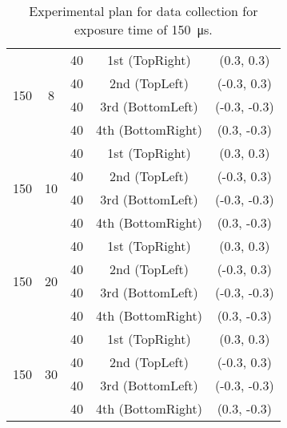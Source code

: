 \begin{table}[ht]
{\begin{tabular}{ccccc}
                \midrule

                \multirow{4}{*}{150} & \multirow{4}{*}{8} & 40 & 1st (\textsf{TopRight}) & (0.3, 0.3) \\
                & & 40 & 2nd (\textsf{TopLeft}) & (-0.3, 0.3) \\
                & & 40 & 3rd (\textsf{BottomLeft}) & (-0.3, -0.3) \\
                & & 40 & 4th (\textsf{BottomRight}) & (0.3, -0.3) \\

                \midrule

                \multirow{4}{*}{150} & \multirow{4}{*}{10} & 40 & 1st (\textsf{TopRight}) & (0.3, 0.3) \\
                & & 40 & 2nd (\textsf{TopLeft}) & (-0.3, 0.3) \\
                & & 40 & 3rd (\textsf{BottomLeft}) & (-0.3, -0.3) \\
                & & 40 & 4th (\textsf{BottomRight}) & (0.3, -0.3) \\

                \midrule

                \multirow{4}{*}{150} & \multirow{4}{*}{20} & 40 & 1st (\textsf{TopRight}) & (0.3, 0.3) \\
                & & 40 & 2nd (\textsf{TopLeft}) & (-0.3, 0.3) \\
                & & 40 & 3rd (\textsf{BottomLeft}) & (-0.3, -0.3) \\
                & & 40 & 4th (\textsf{BottomRight}) & (0.3, -0.3) \\
                
                \midrule

                \multirow{4}{*}{150} & \multirow{4}{*}{30} & 40 & 1st (\textsf{TopRight}) & (0.3, 0.3) \\
                & & 40 & 2nd (\textsf{TopLeft}) & (-0.3, 0.3) \\
                & & 40 & 3rd (\textsf{BottomLeft}) & (-0.3, -0.3) \\
                & & 40 & 4th (\textsf{BottomRight}) & (0.3, -0.3) \\
                \bottomrule
            \end{tabular}
            }
            \caption{Experimental plan for data collection for exposure time of \SI{150}{\micro\second}.}
            \label{table:exp_plan_gain}
        \end{table}
    
